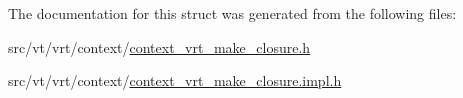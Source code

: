 The documentation for this struct was generated from the following files\+:\begin{DoxyCompactItemize}
\item 
src/vt/vrt/context/\hyperlink{context__vrt__make__closure_8h}{context\+\_\+vrt\+\_\+make\+\_\+closure.\+h}\item 
src/vt/vrt/context/\hyperlink{context__vrt__make__closure_8impl_8h}{context\+\_\+vrt\+\_\+make\+\_\+closure.\+impl.\+h}\end{DoxyCompactItemize}
